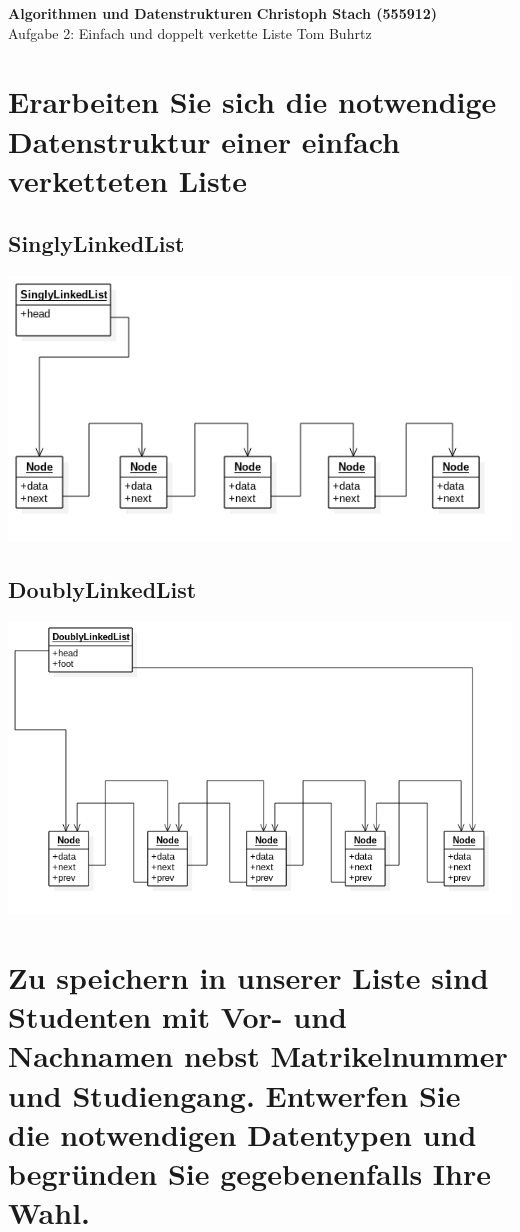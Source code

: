 \documentclass[a4paper, 11pt]{article}
\begin{document}
\noindent
\large\textbf{Algorithmen und Datenstrukturen} \hfill \textbf{Christoph Stach (555912)} \\
\normalsize Aufgabe 2: Einfach und doppelt verkette Liste \hfill Tom Buhrtz \\

\section*{Erarbeiten Sie sich die notwendige Datenstruktur einer einfach verketteten Liste}


\subsection*{SinglyLinkedList}
\includegraphics[width=\linewidth]{SinglyLinkedList}
\subsection*{DoublyLinkedList}
\includegraphics[width=\linewidth]{DoublyLinkedList}


\section*{Zu speichern in unserer Liste sind Studenten mit Vor- und Nachnamen nebst Matrikelnummer und Studiengang.
          Entwerfen Sie die notwendigen Datentypen und begründen Sie gegebenenfalls Ihre Wahl.}
\end{document}
